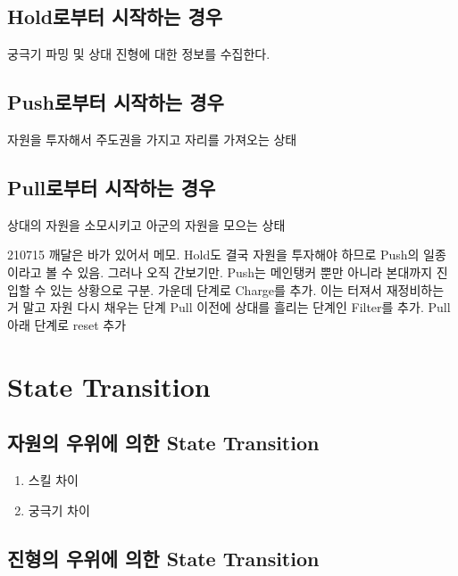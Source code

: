 \subsection{Hold로부터 시작하는 경우}
궁극기 파밍 및 상대 진형에 대한 정보를 수집한다.
\subsection{Push로부터 시작하는 경우}
자원을 투자해서 주도권을 가지고 자리를 가져오는 상태
\subsection{Pull로부터 시작하는 경우}
상대의 자원을 소모시키고 아군의 자원을 모으는 상태


210715 깨달은 바가 있어서 메모.
Hold도 결국 자원을 투자해야 하므로 Push의 일종이라고 볼 수 있음. 그러나 오직 간보기만.
Push는 메인탱커 뿐만 아니라 본대까지 진입할 수 있는 상황으로 구분.
가운데 단계로 Charge를 추가. 이는 터져서 재정비하는 거 말고 자원 다시 채우는 단계
Pull 이전에 상대를 흘리는 단계인 Filter를 추가.
Pull 아래 단계로 reset 추가



\section{State Transition}
\subsection{자원의 우위에 의한 State Transition}
\begin{enumerate}
    \item 스킬 차이
    \item 궁극기 차이
\end{enumerate}
\subsection{진형의 우위에 의한 State Transition} 